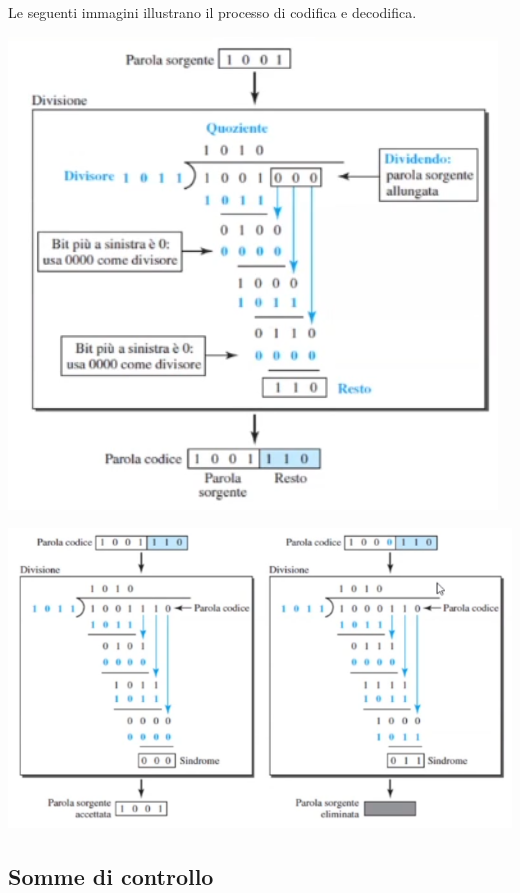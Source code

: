                Le seguenti immagini illustrano il processo di codifica e decodifica.
                
                \begin{center}
                    \includegraphics[scale=0.5]{images/Codici-Ciclici.png}
                \end{center}
                
                \begin{center}
                    \includegraphics[scale=0.5]{images/Codici-Ciclici-Decodifica.png}
                \end{center}
                
    \subsection{Somme di controllo}
    
